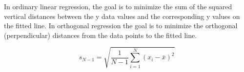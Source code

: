 	In ordinary linear regression, the goal is to minimize the sum of
		the squared vertical distances between the y data values and the
		corresponding y values on the fitted line. In orthogonal
		regression the goal is to minimize the orthogonal (perpendicular)
		distances from the data points to the fitted line.
		
		
		
		
		\[ s_{N - 1} = \sqrt {\frac{1}{{N - 1}}\sum\limits_{i = 1}^N {\left( {x_i - \bar x} \right)^2 }
		} \]
		
		
